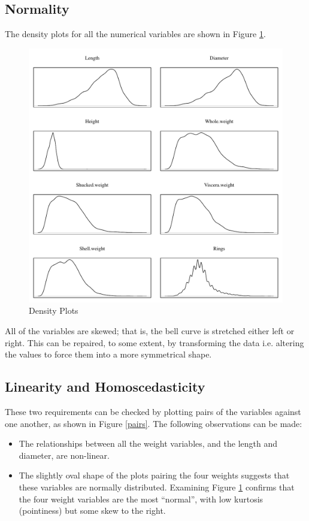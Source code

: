 \documentclass[11pt, a4paper]{article}
\begin{document}
    \subsection{Normality}

    The density plots for all the numerical variables are shown in Figure \ref{density}.

    \begin{figure}[hbt!]
        \centering
        \includegraphics[width=\textwidth]{1.4.pdf}
        \caption{Density Plots}
        \label{density}
    \end{figure}

    All of the variables are skewed; that is, the bell curve is stretched either left or right. This can be repaired, to some extent, by transforming the data i.e. altering the values to force them into a more symmetrical shape.

    \subsection{Linearity and Homoscedasticity}

    These two requirements can be checked by plotting pairs of the variables against one another, as shown in Figure \ref{pairs}. The following observations can be made:

    \begin{itemize}
        \item The relationships between all the weight variables, and the length and diameter, are non-linear.
        \item The slightly oval shape of the plots pairing the four weights suggests that these variables are normally distributed. Examining Figure \ref{density} confirms that the four weight variables are the most ``normal'', with low kurtosis (pointiness) but some skew to the right.
    \end{itemize}
\end{document}
